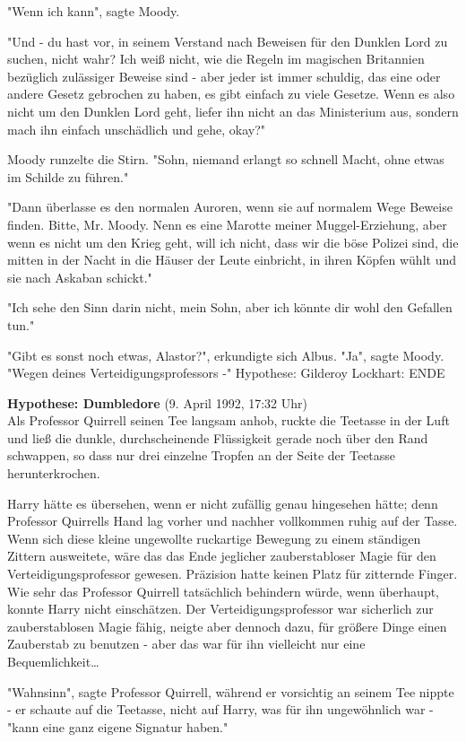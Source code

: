 {"Wenn ich kann", sagte Moody.

"Und - du hast vor, in seinem Verstand nach Beweisen für den Dunklen Lord zu suchen, nicht wahr? Ich weiß nicht, wie die Regeln im magischen Britannien bezüglich zulässiger Beweise sind - aber jeder ist immer schuldig, das eine oder andere Gesetz gebrochen zu haben, es gibt einfach zu viele Gesetze. Wenn es also nicht um den Dunklen Lord geht, liefer ihn nicht an das Ministerium aus, sondern mach ihn einfach unschädlich und gehe, okay?"

Moody runzelte die Stirn. "Sohn, niemand erlangt so schnell Macht, ohne etwas im Schilde zu führen."

"Dann überlasse es den normalen Auroren, wenn sie auf normalem Wege Beweise finden. Bitte, Mr. Moody. Nenn es eine Marotte meiner Muggel-Erziehung, aber wenn es nicht um den Krieg geht, will ich nicht, dass wir die böse Polizei sind, die mitten in der Nacht in die Häuser der Leute einbricht, in ihren Köpfen wühlt und sie nach Askaban schickt."

"Ich sehe den Sinn darin nicht, mein Sohn, aber ich könnte dir wohl den Gefallen tun."

"Gibt es sonst noch etwas, Alastor?", erkundigte sich Albus. "Ja", sagte Moody. "Wegen deines Verteidigungsprofessors -" Hypothese: Gilderoy Lockhart: ENDE

\textbf{Hypothese: Dumbledore} (9. April 1992, 17:32 Uhr)\\ Als Professor Quirrell seinen Tee langsam anhob, ruckte die Teetasse in der Luft und ließ die dunkle, durchscheinende Flüssigkeit gerade noch über den Rand schwappen, so dass nur drei einzelne Tropfen an der Seite der Teetasse herunterkrochen.

Harry hätte es übersehen, wenn er nicht zufällig genau hingesehen hätte; denn Professor Quirrells Hand lag vorher und nachher vollkommen ruhig auf der Tasse. Wenn sich diese kleine ungewollte ruckartige Bewegung zu einem ständigen Zittern ausweitete, wäre das das Ende jeglicher zauberstabloser Magie für den Verteidigungsprofessor gewesen. Präzision hatte keinen Platz für zitternde Finger. Wie sehr das Professor Quirrell tatsächlich behindern würde, wenn überhaupt, konnte Harry nicht einschätzen. Der Verteidigungsprofessor war sicherlich zur zauberstablosen Magie fähig, neigte aber dennoch dazu, für größere Dinge einen Zauberstab zu benutzen - aber das war für ihn vielleicht nur eine Bequemlichkeit…

"Wahnsinn", sagte Professor Quirrell, während er vorsichtig an seinem Tee nippte - er schaute auf die Teetasse, nicht auf Harry, was für ihn ungewöhnlich war - "kann eine ganz eigene Signatur haben."

}
